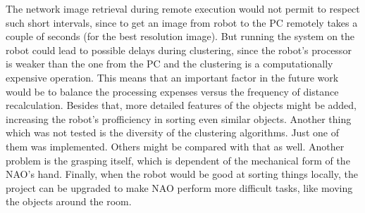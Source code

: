 	The network image retrieval during remote execution would not permit to respect such short intervals, since to get an image from robot to the PC remotely takes a couple of seconds (for the best resolution image). But running the system on the robot could lead to possible delays during clustering, since the robot's processor is weaker than the one from the PC and the clustering is a computationally expensive operation. This means that an important factor in the future work would be to balance the processing expenses versus the frequency of distance recalculation. Besides that, more detailed features of the objects might be added, increasing the robot's profficiency in sorting even similar objects. Another thing which was not tested is the diversity of the clustering algorithms. Just one of them was implemented. Others might be compared with that as well. Another problem is the grasping itself, which is dependent of the mechanical form of the NAO's hand. Finally, when the robot would be good at sorting things locally, the project can be upgraded to make NAO perform more difficult tasks, like moving the objects around the room. 



\clearpage